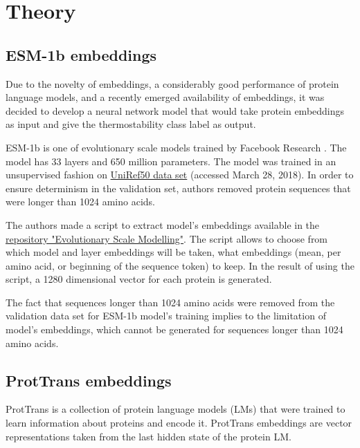 \documentclass[12pt]{article}
\begin{document}
	\newpage

	\section{Theory}

	\subsection{ESM-1b embeddings}

	Due to the novelty of embeddings, a considerably good performance of
	protein language models, and a recently emerged availability of embeddings,
	it was decided to develop a neural network model that would take protein
	embeddings as input and give the thermostability class
	label as output.

	ESM-1b is one of evolutionary scale models trained by Facebook Research 
	\cite{rives2021biological}. The model has 33 layers and 650 million parameters. 
	The model was trained in an 
	unsupervised fashion on 
	\href{ftp://ftp.uniprot.org/pub/databases/uniprot/uniref/uniref50}{UniRef50 data set}
	(accessed March 28, 2018)\cite{suzek2015uniref}. In order 
	to ensure
	determinism in the validation set, authors removed protein sequences that
	were longer than 1024 amino acids. 

	The authors made a script to extract model's embeddings available in the 
	\href{https://github.com/facebookresearch/esm}{repository "Evolutionary Scale Modelling"}.
	The script allows to choose 
	from which model and layer embeddings will be taken, what embeddings 
	(mean, per amino acid, or beginning of the sequence token) to keep. In the
	result of using the script, a 1280 dimensional vector for each protein is 
	generated.
	
	The fact that sequences longer than 1024 amino acids were removed from the 
	validation data set for ESM-1b model's training implies to the limitation of 
	model's embeddings, which cannot be generated for sequences longer than 
	1024 amino acids.

	\subsection{ProtTrans embeddings}

	ProtTrans \cite{elnaggar2020prottrans} is a collection 
	of protein language models 
	(LMs) that were trained to learn information about 
	proteins and encode it. ProtTrans embeddings are vector 
	representations taken from the last hidden state of 
	the protein LM. 
\end{document}
